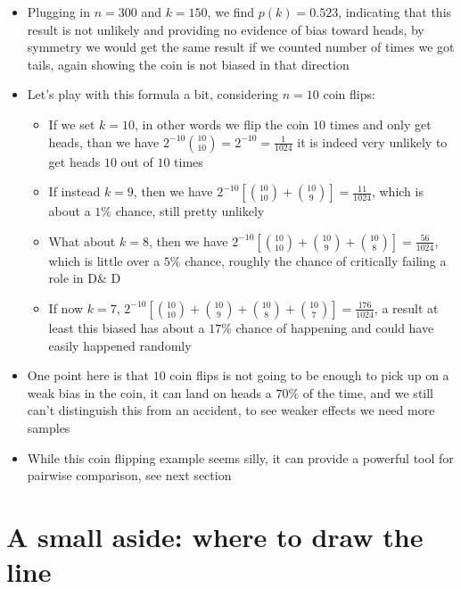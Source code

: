 \documentclass[english]{article}
\begin{document}
\begin{itemize}
\begin{equation}
p(k)=2^{-n}\sum^n_{i=k}\binom{n}{i}
\end{equation}
\item Plugging in $n=300$ and $k=150$, we find $p(k)=0.523$, indicating that this result is not unlikely and providing no evidence of bias toward heads, by symmetry we would get the same result if we counted number of times we got tails, again showing the coin is not biased in that direction
\item Let's play with this formula a bit, considering $n=10$ coin flips:
\begin{itemize}
\item If we set $k=10$, in other words we flip the coin $10$ times and only get heads, than we have $2^{-10}\binom{10}{10}=2^{-10}=\frac{1}{1024}$ it is indeed very unlikely to get heads $10$ out of $10$ times
\item If instead $k=9$, then we have $2^{-10}\left[\binom{10}{10}+\binom{10}{9}\right]=\frac{11}{1024}$, which is about a $1\%$ chance, still pretty unlikely
\item What about $k=8$, then we have $2^{-10}\left[\binom{10}{10}+\binom{10}{9}+\binom{10}{8}\right]=\frac{56}{1024}$, which is little over a $5\%$ chance, roughly the chance of critically failing a role in D\& D
\item If now $k=7$, $2^{-10}\left[\binom{10}{10}+\binom{10}{9}+\binom{10}{8}+\binom{10}{7}\right]=\frac{176}{1024}$, a result at least this biased has about a $17\%$ chance of happening and could have easily happened randomly
\end{itemize}
\item One point here is that $10$ coin flips is not going to be enough to pick up on a weak bias in the coin, it can land on heads a $70\%$ of the time, and we still can't distinguish this from an accident, to see weaker effects we need more samples
\item While this coin flipping example seems silly, it can provide a powerful tool for pairwise comparison, see next section
\end{itemize}

\section{A small aside: where to draw the line}
\end{document}
